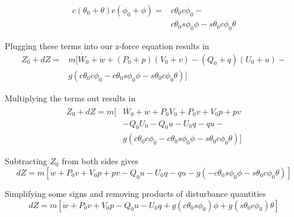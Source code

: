 \documentclass[a4paper]{article}
\begin{document}
\begin{equation}
\begin{split}
c(\theta_0 + \theta)c(\phi_0 + \phi) = & c\theta_0 c\phi_0  - \\
                                       & c\theta_0  s\phi_0 \phi - s\theta_0 c\phi_0 \theta
\end{split}
\end{equation}

\noindent Plugging these terms into our z-force equation results in
\begin{equation*}
\begin{split}
Z_0 + dZ = & m [\dot{W_0} + \dot{w} + (P_0 + p) (V_0 + v) - (Q_0 + q) (U_0 + u) - \\ 
    & g (c\theta_0 c\phi_0  - c\theta_0  s\phi_0 \phi - s\theta_0 c\phi_0 \theta)]
\end{split}
\end{equation*}

\noindent Multiplying the terms out results in
\begin{equation*}
\begin{split}
Z_0 + dZ = m[ & \dot{W_0} + \dot{w} + P_0 V_0 + P_0 v + V_0 p + p v \\
       & - Q_0 U_0 - Q_0 u - U_0 q - q u - \\
       & g (c\theta_0 c\phi_0  - c\theta_0  s\phi_0 \phi - s\theta_0 c\phi_0 \theta)]
\end{split}
\end{equation*}

\noindent Subtracting $Z_0$ from both sides gives
\begin{equation*}
dZ = m[\dot{w} + P_0 v + V_0 p + p v - Q_0 u - U_0 q - q u - g (- c\theta_0  s\phi_0 \phi - s\theta_0 c\phi_0 \theta)]
\end{equation*}

\noindent Simplifying some signs and removing products of disturbance quantities
\begin{equation*}
dZ = m[\dot{w} + P_0 v + V_0 p - Q_0 u - U_0 q + g (c\theta_0  s\phi_0) \phi + g (s\theta_0 c\phi_0) \theta]
\end{equation*}
\end{document}

